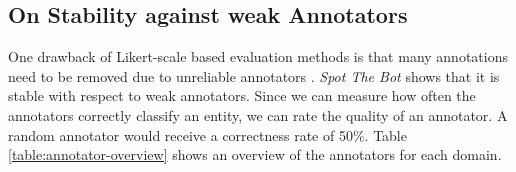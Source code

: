 \documentclass[11pt,a4paper]{article}
\begin{document}


\subsection{On Stability against weak Annotators}
One drawback of Likert-scale based evaluation methods is that many annotations need to be removed due to unreliable annotators \cite{lowe-etal-2017-towards}. \emph{Spot The Bot} shows that it is stable with respect to weak annotators. Since we can measure how often the annotators correctly classify an entity, we can rate the quality of an annotator. A random annotator would receive a correctness rate of 50\%. Table \ref{table:annotator-overview} shows an overview of the annotators for each domain. 
\end{document}

